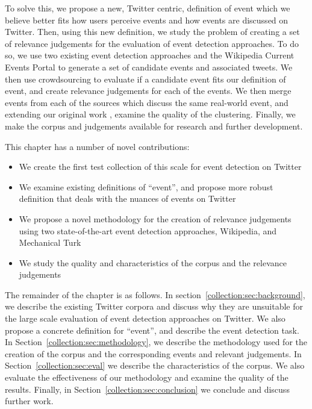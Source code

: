 To solve this, we propose a new, Twitter centric, definition of event which we believe better fits how users perceive events and how events are discussed on Twitter.
Then, using this new definition, we study the problem of creating a set of relevance judgements for the evaluation of event detection approaches.
To do so, we use two existing event detection approaches and the Wikipedia Current Events Portal to generate a set of candidate events and associated tweets.
We then use crowdsourcing to evaluate if a candidate event fits our definition of event, and create relevance judgements for each of the events.
We then merge events from each of the sources which discuss the same real-world event, and extending our original work \citep{McMinn2013}, examine the quality of the clustering.
Finally, we make the corpus and judgements available for research and further development.

This chapter has a number of novel contributions:
\begin{itemize}
\item We create the first test collection of this scale for event detection on Twitter
\item We examine existing definitions of ``event'', and propose more robust definition that deals with the nuances of events on Twitter
\item We propose a novel methodology for the creation of relevance judgements using two state-of-the-art event detection approaches, Wikipedia, and Mechanical Turk
\item We study the quality and characteristics of the corpus and the relevance judgements
\end{itemize}


The remainder of the chapter is as follows. In section~\ref{collection:sec:background}, we describe the existing Twitter corpora and discuss why they are unsuitable for the large scale evaluation of event detection approaches on Twitter.
We also propose a concrete definition for ``event'', and describe the event detection task.
In Section~\ref{collection:sec:methodology}, we describe the methodology used for the creation of the corpus and the corresponding events and relevant judgements.
In Section~\ref{collection:sec:eval} we describe the characteristics of the corpus.
We also evaluate the effectiveness of our methodology and examine the quality of the results.
Finally, in Section~\ref{collection:sec:conclusion} we conclude and discuss further work.